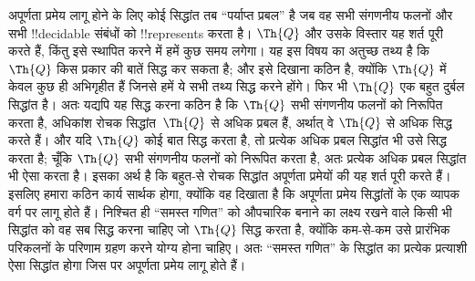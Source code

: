 \documentclass[../../../include/open-logic-section]{subfiles}
\begin{document}
अपूर्णता प्रमेय लागू होने के लिए कोई सिद्धांत तब ``पर्याप्त प्रबल'' है जब वह
सभी संगणनीय फलनों और सभी !!{decidable} संबंधों को !!{represents} करता है।
$\Th{Q}$ और उसके विस्तार यह शर्त पूरी करते हैं, किंतु इसे स्थापित करने में
हमें कुछ समय लगेगा। यह इस विषय का अतुच्छ तथ्य है कि $\Th{Q}$ किस प्रकार की
बातें सिद्ध कर सकता है; और इसे दिखाना कठिन है, क्योंकि $\Th{Q}$ में केवल कुछ
ही अभिगृहीत हैं जिनसे हमें ये सभी तथ्य सिद्ध करने होंगे। फिर भी $\Th{Q}$ एक
बहुत दुर्बल सिद्धांत है। अतः यद्यपि यह सिद्ध करना कठिन है कि $\Th{Q}$ सभी
संगणनीय फलनों को निरूपित करता है, अधिकांश रोचक सिद्धांत~$\Th{Q}$ से अधिक
प्रबल हैं, अर्थात् वे $\Th{Q}$ से अधिक सिद्ध करते हैं। और यदि $\Th{Q}$ कोई
बात सिद्ध करता है, तो प्रत्येक अधिक प्रबल सिद्धांत भी उसे सिद्ध करता है;
चूँकि $\Th{Q}$ सभी संगणनीय फलनों को निरूपित करता है, अतः प्रत्येक अधिक प्रबल
सिद्धांत भी ऐसा करता है। इसका अर्थ है कि बहुत-से रोचक सिद्धांत अपूर्णता
प्रमेयों की यह शर्त पूरी करते हैं। इसलिए हमारा कठिन कार्य सार्थक होगा, क्योंकि
वह दिखाता है कि अपूर्णता प्रमेय सिद्धांतों के एक व्यापक वर्ग पर लागू होते हैं।
निश्चित ही ``समस्त गणित'' को औपचारिक बनाने का लक्ष्य रखने वाले किसी भी
सिद्धांत को वह सब सिद्ध करना चाहिए जो $\Th{Q}$ सिद्ध करता है, क्योंकि
कम-से-कम उसे प्रारंभिक परिकलनों के परिणाम ग्रहण करने योग्य होना चाहिए। अतः
``समस्त गणित'' के सिद्धांत का प्रत्येक प्रत्याशी ऐसा सिद्धांत होगा जिस पर
अपूर्णता प्रमेय लागू होते हैं।
\end{document}
